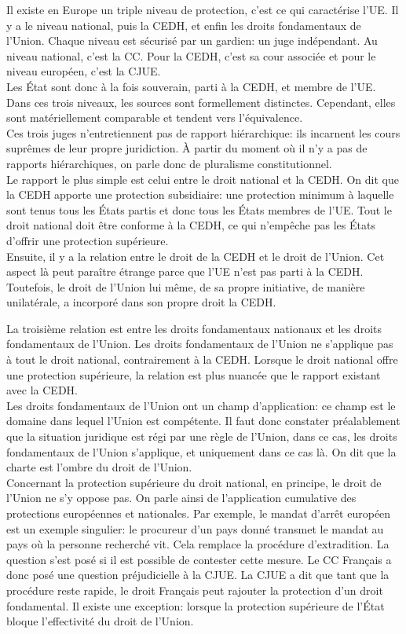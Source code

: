 \documentclass[12pt, a4paper, openany]{book}
\begin{document}
Il existe en Europe un triple niveau de protection, c'est ce qui caractérise l'UE. Il y a le niveau national, puis la CEDH, et enfin les droits fondamentaux de l'Union. Chaque niveau est sécurisé par un gardien: un juge indépendant. Au niveau national, c'est la CC. Pour la CEDH, c'est sa cour associée et pour le niveau européen, c'est la CJUE. \\
Les État sont donc à la fois souverain, parti à la CEDH, et membre de l'UE. \\
Dans ces trois niveaux, les sources sont formellement distinctes. Cependant, elles sont matériellement comparable et tendent vers l'équivalence. \\
Ces trois juges n'entretiennent pas de rapport hiérarchique: ils incarnent les cours suprêmes de leur propre juridiction. À partir du moment où il n'y a pas de rapports hiérarchiques, on parle donc de pluralisme constitutionnel. \\
Le rapport le plus simple est celui entre le droit national et la CEDH. On dit que la CEDH apporte une protection subsidiaire: une protection minimum à laquelle sont tenus tous les États partis et donc tous les États membres de l'UE. Tout le droit national doit être conforme à la CEDH, ce qui n'empêche pas les États d'offrir une protection supérieure. \\
Ensuite, il y a la relation entre le droit de la CEDH et le droit de l'Union. Cet aspect là peut paraître étrange parce que l'UE n'est pas parti à la CEDH. Toutefois, le droit de l'Union lui même, de sa propre initiative, de manière unilatérale, a incorporé dans son propre droit la CEDH.


La troisième relation est entre les droits fondamentaux nationaux et les droits fondamentaux de l'Union. Les droits fondamentaux de l'Union ne s'applique pas à tout le droit national, contrairement à la CEDH. Lorsque le droit national offre une protection supérieure, la relation est plus nuancée que le rapport existant avec la CEDH. \\ 
Les droits fondamentaux de l'Union ont un champ d'application: ce champ est le domaine dans lequel l'Union est compétente. Il faut donc constater préalablement que la situation juridique est régi par une règle de l'Union, dans ce cas, les droits fondamentaux de l'Union s'applique, et uniquement dans ce cas là. On dit que la charte est l'ombre du droit de l'Union. \\
Concernant la protection supérieure du droit national, en principe, le droit de l'Union ne s'y oppose pas. On parle ainsi de l'application cumulative des protections européennes et nationales. Par exemple, le mandat d'arrêt européen est un exemple singulier: le procureur d'un pays donné transmet le mandat au pays où la personne recherché vit. Cela remplace la procédure d'extradition. La question s'est posé si il est possible de contester cette mesure. Le CC Français a donc posé une question préjudicielle à la CJUE. La CJUE a dit que tant que la procédure reste rapide, le droit Français peut rajouter la protection d'un droit fondamental. Il existe une exception: lorsque la protection supérieure de l'État bloque l'effectivité du droit de l'Union.
\end{document}

